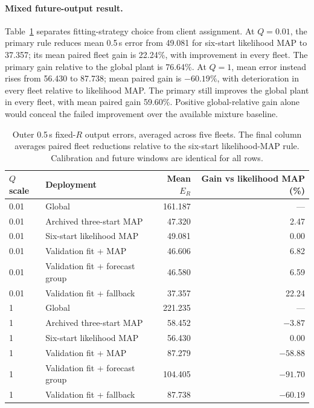 \paragraph{Mixed future-output result.}
Table~\ref{tab:10hl-selection} separates fitting-strategy choice from client
assignment. At $Q=0.01$, the primary rule reduces mean 0.5\,s error from
49.081 for six-start likelihood MAP to 37.357; its mean paired fleet gain
is 22.24\%, with improvement in every fleet. The primary gain relative to
the global plant is 76.64\%. At $Q=1$, mean error instead rises from 56.430
to 87.738; mean paired gain is $-60.19\%$, with deterioration in every fleet
relative to likelihood MAP. The primary still improves the global plant in
every fleet, with mean paired gain 59.60\%. Positive global-relative gain
alone would conceal the failed improvement over the available mixture baseline.

\begin{table}[htbp]
\centering
\caption{Outer 0.5\,s fixed-$R$ output errors, averaged across five fleets.
The final column averages paired fleet reductions relative to the six-start
likelihood-MAP rule. Calibration and future windows are identical for all rows.}
\label{tab:10hl-selection}
\begin{tabular}{llrr}
\toprule
$Q$ scale & Deployment & Mean $E_R$ & Gain vs likelihood MAP (\%)\\
\midrule
0.01 & Global & 161.187 & ---\\
0.01 & Archived three-start MAP & 47.320 & 2.47\\
0.01 & Six-start likelihood MAP & 49.081 & 0.00\\
0.01 & Validation fit + MAP & 46.606 & 6.82\\
0.01 & Validation fit + forecast group & 46.580 & 6.59\\
0.01 & Validation fit + fallback & 37.357 & 22.24\\
\midrule
1 & Global & 221.235 & ---\\
1 & Archived three-start MAP & 58.452 & $-3.87$\\
1 & Six-start likelihood MAP & 56.430 & 0.00\\
1 & Validation fit + MAP & 87.279 & $-58.88$\\
1 & Validation fit + forecast group & 104.405 & $-91.70$\\
1 & Validation fit + fallback & 87.738 & $-60.19$\\
\bottomrule
\end{tabular}
\end{table}

